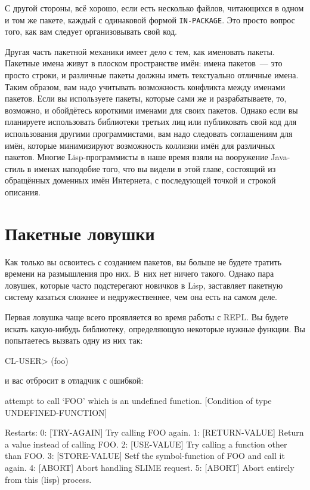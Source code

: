 С другой стороны, всё хорошо, если есть несколько файлов, читающихся в одном и том же
пакете, каждый с одинаковой формой \lstinline{IN-PACKAGE}. Это просто вопрос того, как вам
следует организовывать свой код.

Другая часть пакетной механики имеет дело с тем, как именовать пакеты. Пакетные имена
живут в плоском пространстве имён: имена пакетов~--- это просто строки, и различные пакеты
должны иметь текстуально отличные имена. Таким образом, вам надо учитывать возможность
конфликта между именами пакетов. Если вы ис\-поль\-зуе\-те пакеты, которые сами же и
разрабатываете, то, возможно, и обойдётесь короткими именами для своих пакетов. Однако если
вы планируете использовать библиотеки третьих лиц или публиковать свой код для
использования другими программистами, вам надо следовать соглашениям для имён, которые
минимизируют возможность коллизии имён для различных пакетов. Многие Lisp-программисты в
наше время взяли на вооружение Java-стиль в именах наподобие того, что вы видели в этой
главе, состоящий из обращённых доменных имён Интернета, с последующей точкой и строкой
описания.

\section{Пакетные ловушки}
\label{sec:21-pitfalls}

Как только вы освоитесь с созданием пакетов, вы больше не будете тратить времени на
размышления про них. В~них нет ничего такого. Однако пара ловушек, которые часто
подстерегают новичков в Lisp, заставляет пакетную систему казаться сложнее и
недружественнее, чем она есть на самом деле.

Первая ловушка чаще всего проявляется во время работы с REPL. Вы будете искать
какую-нибудь библиотеку, определяющую некоторые нужные функции. Вы попытаетесь вызвать
одну из них так:

\begin{myverb}
CL-USER> (foo)
\end{myverb}

\noindent{}и вас отбросит в отладчик с ошибкой:

\begin{myverb}
attempt to call `FOO' which is an undefined function.
   [Condition of type UNDEFINED-FUNCTION]

Restarts:
  0: [TRY-AGAIN] Try calling FOO again.
  1: [RETURN-VALUE] Return a value instead of calling FOO.
  2: [USE-VALUE] Try calling a function other than FOO.
  3: [STORE-VALUE] Setf the symbol-function of FOO and call it again.
  4: [ABORT] Abort handling SLIME request.
  5: [ABORT] Abort entirely from this (lisp) process.
\end{myverb}

